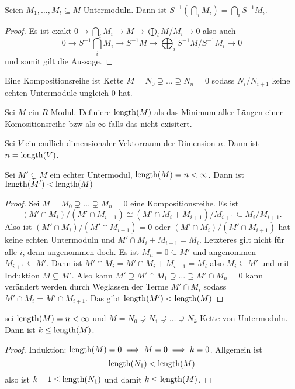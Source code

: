 \begin{Kor}
    Seien $M_1,\dots,M_t\subseteq M$ Untermoduln. Dann ist $S^{-1}(\bigcap_i M_i)=\bigcap_i S^{-1}M_i$.
\end{Kor}
\begin{proof}
    Es ist exakt $0\to \bigcap_i M_i\to M\to \bigoplus_i M/M_i\to 0$ also auch 
    $$0\to S^{-1}\bigcap_i M_i\to S^{-1}M\to \bigoplus_i S^{-1}M/S^{-1}M_i\to 0$$ und somit gilt die Aussage.
\end{proof}
\begin{Def}
    Eine Kompositionsreihe ist Kette $M=N_0\supsetneq \dots \supsetneq N_n=0$ sodass $N_i/N_{i+1}$ keine echten Untermodule ungleich $0$ hat.
\end{Def}
\begin{Def}
    Sei $M$ ein $R$-Modul. Definiere 
    $\operatorname{length}(M)$ als das Minimum aller Längen einer Komositionsreihe bzw als $\infty$ falls das nicht exisitert.
\end{Def}
\begin{Bsp}
    Sei $V$ ein endlich-dimensionaler Vektorraum der Dimension $n$. Dann ist $n=\operatorname{length}(V)$.
\end{Bsp}
\begin{Lemma}
    Sei $M'\subsetneq M$ ein echter Untermodul, $\operatorname{length}(M)=n<\infty$. Dann ist $\operatorname{length}(M')<\operatorname{length}(M)$
\end{Lemma}
\begin{proof}
    Sei $M=M_0\supsetneq \dots\supsetneq M_n=0$ eine Kompositionsreihe. Es ist $$(M'\cap M_i)/(M'\cap M_{i+1})\cong (M'\cap M_i+M_{i+1})/M_{i+1}\subseteq M_i/M_{i+1}.$$
    Also ist $(M'\cap M_i)/(M'\cap M_{i+1})=0$ oder $(M'\cap M_i)/(M'\cap M_{i+1})$ hat keine echten Untermoduln und $M'\cap M_i+M_{i+1}=M_i$.
    Letzteres gilt nicht für alle $i$, denn angenommen doch. Es ist $M_n=0\subseteq M'$ und angenommen $M_{i+1}\subseteq M'$. Dann ist $M'\cap M_i=M'\cap M_i+M_{i+1}=M_i$ also $M_i\subseteq M'$ und mit Induktion $M\subseteq M'$.
    Also kann $M'\supseteq M'\cap M_1\supseteq\dots \supseteq M'\cap M_n=0$ kann verändert werden durch Weglassen der Terme $M'\cap M_i$ sodass $M'\cap M_i=M'\cap M_{i+1}$. Das gibt $\operatorname{length}(M')<\operatorname{length}(M)$
\end{proof}
\begin{Lemma}
    sei $\operatorname{length}(M)=n<\infty$ und $M=N_0\supsetneq N_1\supsetneq\dots\supsetneq N_k$ Kette von Untermoduln. Dann ist $k\leq \operatorname{length}(M)$. 
\end{Lemma}
\begin{proof}
    Induktion: $\operatorname{length}(M)=0\implies M=0\implies k=0$.
    Allgemein ist $$\operatorname{length}(N_1)<\operatorname{length}(M)$$ also ist $k-1\leq \operatorname{length}(N_1)$ und damit $k\leq \operatorname{length}(M)$.
\end{proof}
